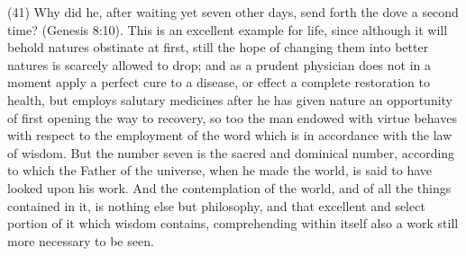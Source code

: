 (41) Why did he, after waiting yet seven other days, send forth the dove a second time? (Genesis
8:10). This is an excellent example for life, since although it will behold natures obstinate at first,
still the hope of changing them into better natures is scarcely allowed to drop; and as a prudent
physician does not in a moment apply a perfect cure to a disease, or effect a complete restoration
to health, but employs salutary medicines after he has given nature an opportunity of first opening
the way to recovery, so too the man endowed with virtue behaves with respect to the employment
of the word which is in accordance with the law of wisdom. But the number seven is the sacred and
dominical number, according to which the Father of the universe, when he made the world, is said
to have looked upon his work. And the contemplation of the world, and of all the things contained in
it, is nothing else but philosophy, and that excellent and select portion of it which wisdom contains,
comprehending within itself also a work still more necessary to be seen.

